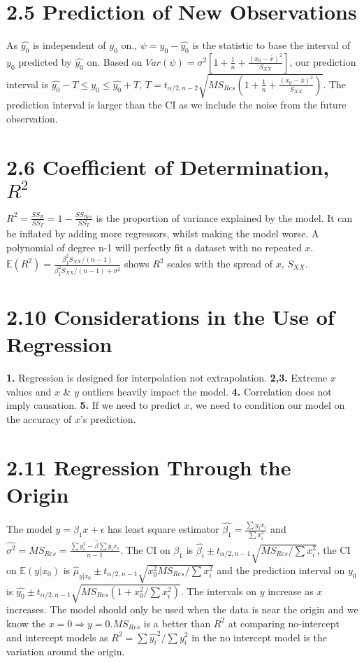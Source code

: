 \begin{multicols*}{3}
\section{2.5 Prediction of New Observations}
As $\hat{y_0}$ is independent of $y_0$ on., $\psi = y_0 - \hat{y_0}$ is the statistic to base the interval of $y_0$ predicted by $\hat{y_0}$ on. Based on $Var(\psi) = \sigma^2[1 + \frac{1}{n} + \frac{(x_0 - \bar{x})^2}{S_{XX}}]$, our prediction interval is $\hat{y_0} - T \le y_0 \le \hat{y_0} + T$, $T = t_{\alpha/2,n-2}\sqrt{MS_{Res}(1 + \frac{1}{n} + \frac{(x_0 - \bar{x})^2}{S_{XX}})}$. The prediction interval is larger than the CI as we include the noise from the future observation.
\section{2.6 Coefficient of Determination, $R^2$}
$R^2 = \frac{SS_R}{SS_T} = 1 - \frac{SS_{Res}}{SS_T}$ is the proportion of variance explained by the model. It can be inflated by adding more regressors, whilst making the model worse. A polynomial of degree n-1 will perfectly fit a dataset with no repeated $x$. $\mathbb{E}(R^2) = \frac{\beta_1^2S_{XX}/(n - 1)}{\beta_1^2S_{XX}/(n - 1) + \sigma^2}$ shows $R^2$ scales with the spread of $x$, $S_{XX}$.

\section{2.10 Considerations in the Use of Regression}
\textbf{1.} Regression is designed for interpolation not extrapolation. \textbf{2,3.} Extreme $x$ values and $x$ \& $y$ outliers heavily impact the model. \textbf{4.} Correlation does not imply causation. \textbf{5.} If we need to predict $x$, we need to condition our model on the accuracy of $x$'s prediction.

\section{2.11 Regression Through the Origin}
The model $y = \beta_1x + \epsilon$ has least square estimator $\hat{\beta_1} = \frac{\sum y_ix_i}{\sum x_i^2}$ and $\hat{\sigma^2} = MS_{Res} = \frac{\sum y_i^2 - \hat{\beta}\sum y_i x_i}{n - 1}$. The CI on $\beta_1$ is $\hat{\beta_i} \pm t_{\alpha/2,n-1} \sqrt{MS_{Res}/\sum x_i^2}$, the CI on $\mathbb{E}(y|x_0)$ is $\hat{\mu}_{y|x_0} \pm t_{\alpha/2,n-1} \sqrt{x_0^2 MS_{Res} / \sum x_i^2}$ and the prediction interval on $y_0$ is $\hat{y_0} \pm t_{\alpha/2,n-1} \sqrt{MS_{Res} (1 + x_0^2/\sum x_i^2)}$. The intervals on $y$ increase as $x$ increases. The model should only be used when the data is near the origin and we know the $x = 0 \Rightarrow y = 0$.$MS_{Res}$ is a better than $R^2$ at comparing no-intercept and intercept models as $R^2 = \sum \hat{y_i}^2 / \sum y_i^2$ in the no intercept model is the variation around the origin.


\end{multicols*}
